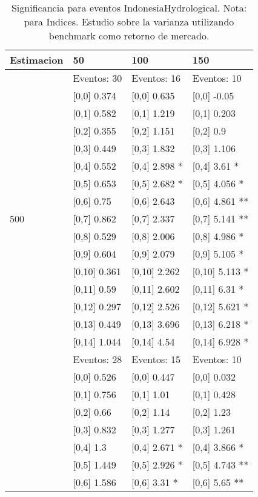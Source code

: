 \begin{table}

\caption{Significancia para eventos IndonesiaHydrological. Nota: para Indices. Estudio sobre la varianza utilizando benchmark como retorno de mercado.}
\centering
\begin{tabular}[t]{llll}
\toprule
Estimacion & 50 & 100 & 150\\
\midrule
 & Eventos:  30 & Eventos:  16 & Eventos:  10\\
 & {}[0,0] 0.374 & {}[0,0] 0.635 & {}[0,0] -0.05\\
 & {}[0,1] 0.582 & {}[0,1] 1.219 & {}[0,1] 0.203\\
 & {}[0,2] 0.355 & {}[0,2] 1.151 & {}[0,2] 0.9\\
 & {}[0,3] 0.449 & {}[0,3] 1.832 & {}[0,3] 1.106\\
\addlinespace
 & {}[0,4] 0.552 & {}[0,4] 2.898 * & {}[0,4] 3.61 *\\
 & {}[0,5] 0.653 & {}[0,5] 2.682 * & {}[0,5] 4.056 *\\
 & {}[0,6] 0.75 & {}[0,6] 2.643 & {}[0,6] 4.861 **\\
500 & {}[0,7] 0.862 & {}[0,7] 2.337 & {}[0,7] 5.141 **\\
 & {}[0,8] 0.529 & {}[0,8] 2.006 & {}[0,8] 4.986 *\\
\addlinespace
 & {}[0,9] 0.604 & {}[0,9] 2.079 & {}[0,9] 5.105 *\\
 & {}[0,10] 0.361 & {}[0,10] 2.262 & {}[0,10] 5.113 *\\
 & {}[0,11] 0.59 & {}[0,11] 2.602 & {}[0,11] 6.31 *\\
 & {}[0,12] 0.297 & {}[0,12] 2.526 & {}[0,12] 5.621 *\\
 & {}[0,13] 0.449 & {}[0,13] 3.696 & {}[0,13] 6.218 *\\
\addlinespace
 & {}[0,14] 1.044 & {}[0,14] 4.54 & {}[0,14] 6.928 *\\
 & Eventos:  28 & Eventos:  15 & Eventos:  10\\
 & {}[0,0] 0.526 & {}[0,0] 0.447 & {}[0,0] 0.032\\
 & {}[0,1] 0.756 & {}[0,1] 1.01 & {}[0,1] 0.428\\
 & {}[0,2] 0.66 & {}[0,2] 1.14 & {}[0,2] 1.23\\
\addlinespace
 & {}[0,3] 0.832 & {}[0,3] 1.277 & {}[0,3] 1.261\\
 & {}[0,4] 1.3 & {}[0,4] 2.671 * & {}[0,4] 3.866 *\\
 & {}[0,5] 1.449 & {}[0,5] 2.926 * & {}[0,5] 4.743 **\\
 & {}[0,6] 1.586 & {}[0,6] 3.31 * & {}[0,6] 5.65 **\\

\end{tabular}
\end{table}
